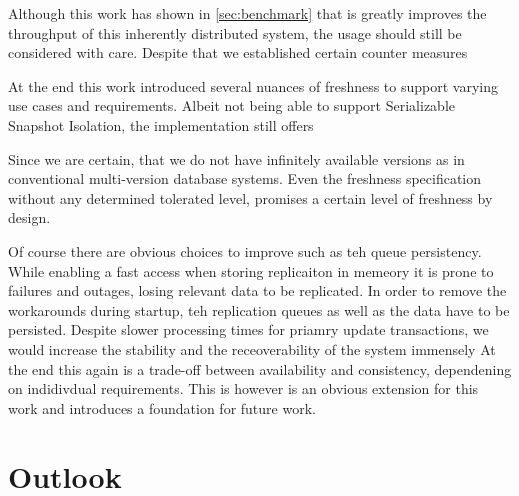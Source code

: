 Although this work has shown in \ref{sec:benchmark} that is greatly improves the throughput of this inherently distributed system, the usage should still be considered with care.
Despite that we established certain counter measures 


At the end this work introduced several nuances of freshness to support varying use cases and requirements.
Albeit not being able to support Serializable Snapshot Isolation, the implementation still offers 

Since we are certain, that we do not have infinitely available versions as in conventional multi-version database systems.
Even the freshness specification without any determined tolerated level, promises a certain level of freshness by design.









Of course there are obvious choices to improve such as teh queue persistency. While enabling a fast access when storing replicaiton in memeory it is prone to failures and outages,
losing relevant data to be replicated. In order to remove the workarounds during startup, teh replication queues as well as the data have to be persisted.
Despite slower processing times for priamry update transactions, we would increase the stability and the receoverability of the system immensely 
At the end this again is a trade-off between availability and consistency, dependening on indidivdual requirements.
This is however is an obvious extension for this work and introduces a foundation for future work.


\section{Outlook}

